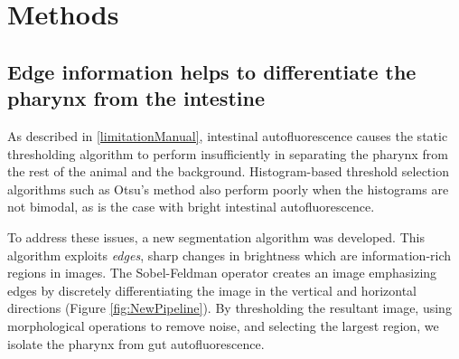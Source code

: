
\chapter{Methods} %

\label{Chapter2} %


\section{Edge information helps to differentiate the pharynx from the intestine} \label{segMethod}

As described in \ref{limitationManual}, intestinal autofluorescence causes the static thresholding algorithm to perform insufficiently in separating the pharynx from the rest of the animal and the background. Histogram-based threshold selection algorithms such as Otsu's method also perform poorly when the histograms are not bimodal, as is the case with bright intestinal autofluorescence.

To address these issues, a new segmentation algorithm was developed. This algorithm exploits \textit{edges}, sharp changes in brightness which are information-rich regions in images. The Sobel-Feldman operator creates an image emphasizing edges by discretely differentiating the image in the vertical and horizontal directions (Figure \ref{fig:NewPipeline}). By thresholding the resultant image, using morphological operations to remove noise, and selecting the largest region, we isolate the pharynx from gut autofluorescence.

